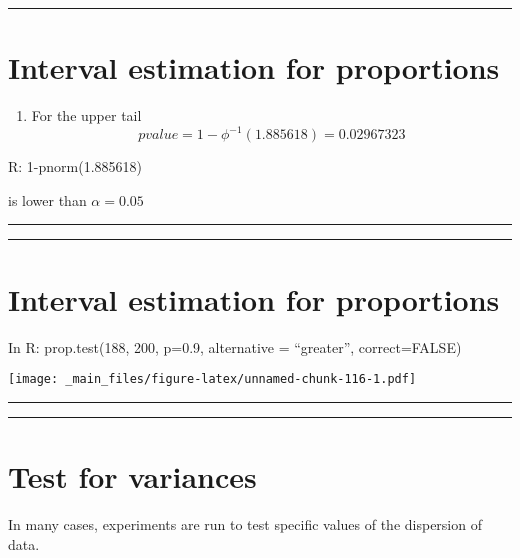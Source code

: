 \documentclass[
]{book}
\providecommand{\tightlist}{%
  \setlength{\itemsep}{0pt}\setlength{\parskip}{0pt}}
\begin{document}
\begin{center}\rule{0.5\linewidth}{0.5pt}\end{center}

\hypertarget{interval-estimation-for-proportions-7}{%
\section{Interval estimation for proportions}\label{interval-estimation-for-proportions-7}}

\begin{enumerate}
\def\labelenumi{\arabic{enumi}.}
\setcounter{enumi}{1}
\tightlist
\item
  For the upper tail \[pvalue=1-\phi^{-1}(1.885618)=0.02967323\]
\end{enumerate}

R: 1-pnorm(1.885618)

is lower than \(\alpha=0.05\)

\begin{center}\rule{0.5\linewidth}{0.5pt}\end{center}

\begin{center}\rule{0.5\linewidth}{0.5pt}\end{center}

\hypertarget{interval-estimation-for-proportions-8}{%
\section{Interval estimation for proportions}\label{interval-estimation-for-proportions-8}}

In R: prop.test(188, 200, p=0.9, alternative = ``greater'', correct=FALSE)

\texttt{[image: \_main\_files/figure-latex/unnamed-chunk-116-1.pdf]}

\begin{center}\rule{0.5\linewidth}{0.5pt}\end{center}

\begin{center}\rule{0.5\linewidth}{0.5pt}\end{center}

\hypertarget{test-for-variances}{%
\section{Test for variances}\label{test-for-variances}}

In many cases, experiments are run to test specific values of the dispersion of data.
\end{document}
